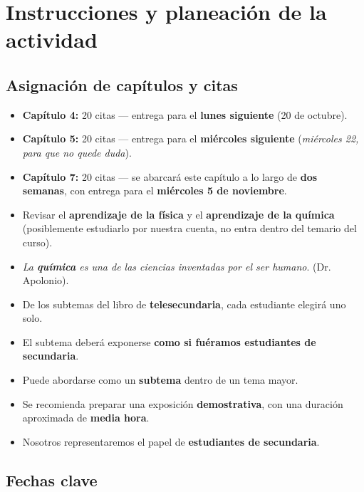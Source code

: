 \documentclass{article}
\begin{document}
\section*{Instrucciones y planeación de la actividad}

\subsection*{Asignación de capítulos y citas}

\begin{itemize}
  \item \textbf{Capítulo 4:} 20 citas — entrega para el \textbf{lunes siguiente} (20 de octubre).
  \item \textbf{Capítulo 5:} 20 citas — entrega para el \textbf{miércoles siguiente} (\textit{miércoles 22, para que no quede duda}).
  \item \textbf{Capítulo 7:} 20 citas — se abarcará este capítulo a lo largo de \textbf{dos semanas}, con entrega para el \textbf{miércoles 5 de noviembre}.
\end{itemize}

\vspace{1em}

\begin{itemize}
  \item Revisar el \textbf{aprendizaje de la física} y el \textbf{aprendizaje de la química} (posiblemente estudiarlo por nuestra cuenta, no entra dentro del temario del curso).
  \item \textit{La \textbf{química} es una de las ciencias inventadas por el ser humano}. (Dr. Apolonio).
  \item De los subtemas del libro de \textbf{telesecundaria}, cada estudiante elegirá uno solo.
  \item El subtema deberá exponerse \textbf{como si fuéramos estudiantes de secundaria}.
  \item Puede abordarse como un \textbf{subtema} dentro de un tema mayor.
  \item Se recomienda preparar una exposición \textbf{demostrativa}, con una duración aproximada de \textbf{media hora}.
  \item Nosotros representaremos el papel de \textbf{estudiantes de secundaria}.
\end{itemize}

\vspace{1em}

\subsection*{Fechas clave}
\end{document}
